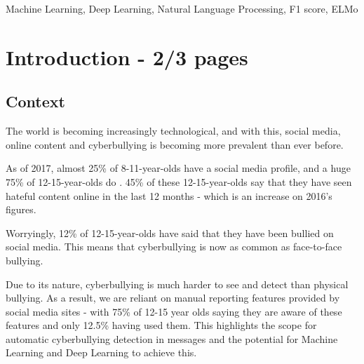 \documentclass[12pt,a4paper]{article}
\begin{document}
\begin{keywords}
	Machine Learning, Deep Learning, Natural Language Processing, F1 score, ELMo
\end{keywords}



\section{Introduction - 2/3 pages}

\subsection{Context}
The world is becoming increasingly technological, and with this, social media, online content and cyberbullying is becoming more prevalent than ever before. 
 
As of 2017, almost 25\% of 8-11-year-olds have a social media profile, and a huge 75\% of 12-15-year-olds do \cite[p.5]{Ofcom}. 45\% of these 12-15-year-olds say that they have seen hateful content online in the last 12 months - which is an increase on 2016's figures.

Worryingly, 12\% of 12-15-year-olds have said that they have been bullied on social media. This means that cyberbullying is now as common as face-to-face bullying.

Due to its nature, cyberbullying is much harder to see and detect than physical bullying. As a result, we are reliant on manual reporting features provided by social media sites - with 75\% of 12-15 year olds saying they are aware of these features \cite[p.5]{Ofcom} and only 12.5\% having used them. This highlights the scope for automatic cyberbullying detection in messages and the potential for Machine Learning and Deep Learning to achieve this.
\end{document}
